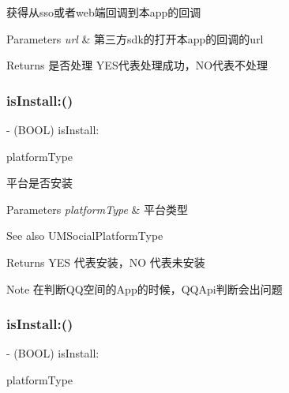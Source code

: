 获得从sso或者web端回调到本app的回调


\begin{DoxyParams}{Parameters}
{\em url} & 第三方sdk的打开本app的回调的url\\
\hline
\end{DoxyParams}
\begin{DoxyReturn}{Returns}
是否处理 Y\+E\+S代表处理成功，\+N\+O代表不处理 
\end{DoxyReturn}
\mbox{\label{interface_u_m_social_manager_afbc82a79cc8d3e1b7b56339dc90693b9}} 
\subsubsection{\texorpdfstring{is\+Install\+:()}{isInstall:()}\hspace{0.1cm}{\footnotesize\ttfamily [1/2]}}
{\footnotesize\ttfamily -\/ (B\+O\+OL) is\+Install\+: \begin{DoxyParamCaption}\item[{(U\+M\+Social\+Platform\+Type)}]{platform\+Type }\end{DoxyParamCaption}}

平台是否安装


\begin{DoxyParams}{Parameters}
{\em platform\+Type} & 平台类型 \\
\hline
\end{DoxyParams}
\begin{DoxySeeAlso}{See also}
U\+M\+Social\+Platform\+Type
\end{DoxySeeAlso}
\begin{DoxyReturn}{Returns}
Y\+ES 代表安装，\+NO 代表未安装 
\end{DoxyReturn}
\begin{DoxyNote}{Note}
在判断\+Q\+Q空间的\+App的时候，\+Q\+Q\+Api判断会出问题 
\end{DoxyNote}
\mbox{\label{interface_u_m_social_manager_afbc82a79cc8d3e1b7b56339dc90693b9}} 
\subsubsection{\texorpdfstring{is\+Install\+:()}{isInstall:()}\hspace{0.1cm}{\footnotesize\ttfamily [2/2]}}
{\footnotesize\ttfamily -\/ (B\+O\+OL) is\+Install\+: \begin{DoxyParamCaption}\item[{(U\+M\+Social\+Platform\+Type)}]{platform\+Type }\end{DoxyParamCaption}}

